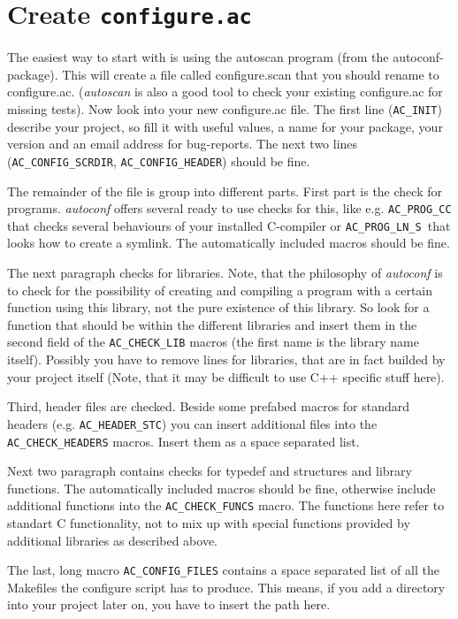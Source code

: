 \section{Create {\tt configure.ac}}

The easiest way to start with is using the autoscan program (from the
autoconf-package). This will create a file called configure.scan that
you should rename to configure.ac. ({\em autoscan\/} is also a good
tool to check your existing configure.ac for missing tests). Now look
into your new configure.ac file. The first line ({\tt AC\_INIT})
describe your project, so fill it with useful values, a name for your
package, your version and an email address for bug-reports. The next
two lines ({\tt AC\_CONFIG\_SCRDIR}, {\tt AC\_CONFIG\_HEADER}) should be
fine.

The remainder of the file is group into different parts. First part is
the check for programs. {\em autoconf\/} offers several ready to use checks
for this, like e.g. {\tt AC\_PROG\_CC} that checks several behaviours of
your installed C-compiler or {\tt AC\_PROG\_LN\_S }that looks how to
create a symlink. The automatically included macros should be fine.

The next paragraph checks for libraries. Note, that the philosophy of
{\em autoconf\/} is to check for the possibility of creating and
compiling a program with a certain function using this library, not
the pure existence of this library. So look for a function that should
be within the different libraries and insert them in the second field
of the {\tt AC\_CHECK\_LIB} macros (the first name is the library name
itself). Possibly you have to remove lines for libraries, that are in
fact builded by your project itself (Note, that it may be difficult to
use C++ specific stuff here).

Third, header files are checked. Beside some prefabed macros for
standard headers (e.g. {\tt AC\_HEADER\_STC}) you can insert additional
files into the {\tt AC\_CHECK\_HEADERS} macros. Insert them as a space
separated list.

Next two paragraph contains checks for typedef and structures and
library functions. The automatically included macros should be fine,
otherwise include additional functions into the {\tt AC\_CHECK\_FUNCS}
macro. The functions here refer to standart C functionality, not to
mix up with special functions provided by additional libraries as
described above.

The last, long macro {\tt AC\_CONFIG\_FILES} contains a space separated
list of all the Makefiles the configure script has to produce. This
means, if you add a directory into your project later on, you have to
insert the path here.



